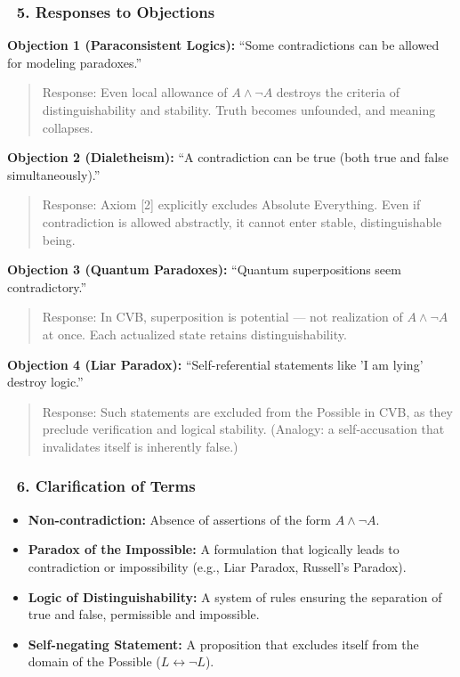 \documentclass[12pt]{article}
\begin{document}
\subsubsection*{🔹 5. Responses to Objections}

\textbf{Objection 1 (Paraconsistent Logics):} ``Some contradictions can be allowed for modeling paradoxes.''

\begin{quote}
Response: Even local allowance of $A \land \neg A$ destroys the criteria of distinguishability and stability. Truth becomes unfounded, and meaning collapses.
\end{quote}

\textbf{Objection 2 (Dialetheism):} ``A contradiction can be true (both true and false simultaneously).''

\begin{quote}
Response: Axiom [2] explicitly excludes Absolute Everything. Even if contradiction is allowed abstractly, it cannot enter stable, distinguishable being.
\end{quote}

\textbf{Objection 3 (Quantum Paradoxes):} ``Quantum superpositions seem contradictory.''

\begin{quote}
Response: In CVB, superposition is potential — not realization of $A \land \neg A$ at once. Each actualized state retains distinguishability.
\end{quote}

\textbf{Objection 4 (Liar Paradox):} ``Self-referential statements like 'I am lying' destroy logic.''

\begin{quote}
Response: Such statements are excluded from the Possible in CVB, as they preclude verification and logical stability. (Analogy: a self-accusation that invalidates itself is inherently false.)
\end{quote}

\subsubsection*{🔹 6. Clarification of Terms}

\begin{itemize}
\item \textbf{Non-contradiction:} Absence of assertions of the form $A \land \neg A$.
\item \textbf{Paradox of the Impossible:} A formulation that logically leads to contradiction or impossibility (e.g., Liar Paradox, Russell's Paradox).
\item \textbf{Logic of Distinguishability:} A system of rules ensuring the separation of true and false, permissible and impossible.
\item \textbf{Self-negating Statement:} A proposition that excludes itself from the domain of the Possible ($L \leftrightarrow \neg L$).
\end{itemize}
\end{document}
